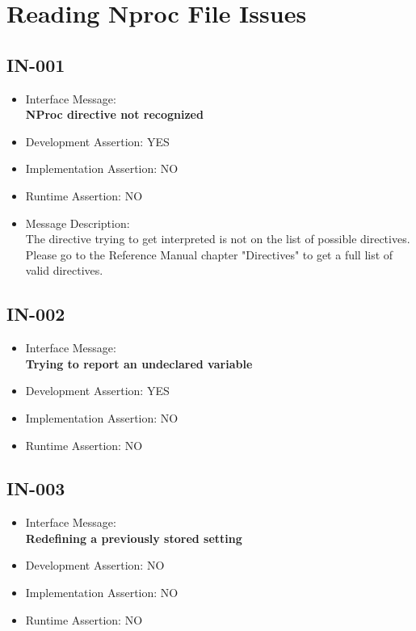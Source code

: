 \section{Reading Nproc File Issues}

\subsection{IN-001}
\begin{itemize}
  \item Interface Message:\\[1em]\textbf{NProc directive not recognized}
  \item Development Assertion: YES
  \item Implementation Assertion: NO
  \item Runtime Assertion: NO
  \item Message Description:\\[1em]The directive trying to get interpreted is not on the list of possible directives. Please go to the Reference Manual chapter "Directives" to get a full list of valid directives.
\end{itemize}

\subsection{IN-002}
\begin{itemize}
  \item Interface Message:\\[1em]\textbf{Trying to report an undeclared variable}
  \item Development Assertion: YES
  \item Implementation Assertion: NO
  \item Runtime Assertion: NO
\end{itemize}

\subsection{IN-003}
\begin{itemize}
  \item Interface Message:\\[1em]\textbf{Redefining a previously stored setting}
  \item Development Assertion: NO
  \item Implementation Assertion: NO
  \item Runtime Assertion: NO
\end{itemize}

